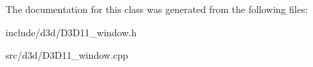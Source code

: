 The documentation for this class was generated from the following files\+:\begin{DoxyCompactItemize}
\item 
include/d3d/D3\+D11\+\_\+window.\+h\item 
src/d3d/D3\+D11\+\_\+window.\+cpp\end{DoxyCompactItemize}
